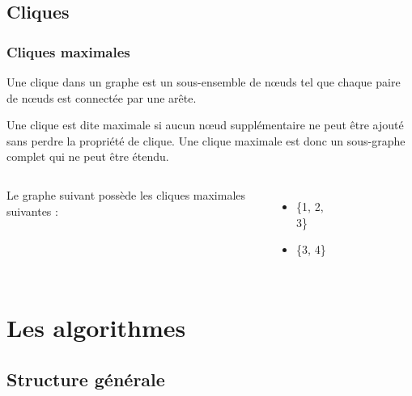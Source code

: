 \documentclass{beamer}
\begin{document}
\subsection{Cliques}
\begin{frame}
  \frametitle{Cliques maximales}
  \begin{definition}
    Une clique dans un graphe est un sous-ensemble de nœuds tel que chaque paire de nœuds est connectée par une arête.
  \end{definition}
  \begin{definition}
    Une clique est dite maximale si aucun nœud supplémentaire ne peut être ajouté sans perdre la propriété de clique. Une clique maximale est donc un sous-graphe complet qui ne peut être étendu.
  \end{definition}
  \begin{example}
    \begin{columns}
      Le graphe suivant possède les cliques maximales suivantes :
      \begin{itemize}
        \item \{1, 2, 3\}
        \item \{3, 4\}
      \end{itemize}
      \begin{figure}
        \centering
      \end{figure}
    \end{columns}
  \end{example}
\end{frame}

\section{Les algorithmes}
\subsection{Structure générale}%
\label{subsec:struct}
\end{document}

